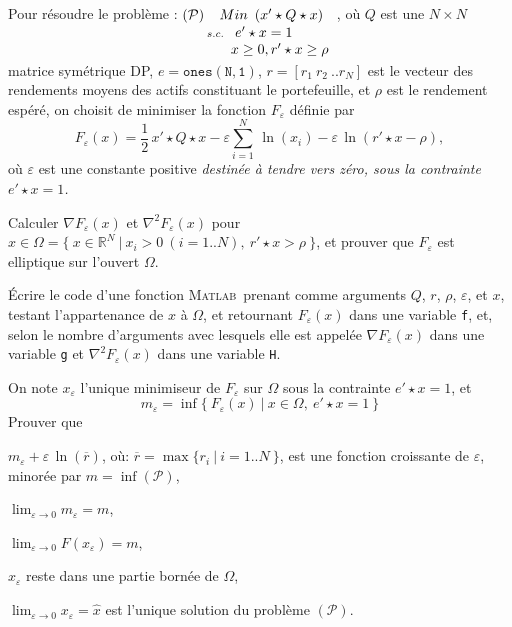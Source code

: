 \documentclass[12pt,a4paper,fleqn]{report}
\newcommand{\matlab}{\textsc{Matlab}}
\newcommand{\R}{\mathbb R}
\newcommand{\grad}{\nabla}
\newcommand{\hess}{\nabla^2}
\newcommand{\on}{\begin{displaymath}}
\newcommand{\off}{\end{displaymath}}
\renewcommand{\P}{\mathcal P}
\newcommand{\push}[1]{\rule{0pt}{0pt}\hspace{#1pt}}
\begin{document}
\begin{exercice}
Pour r\'esoudre le probl\`eme :
\mbox{$ (\P) \push{2} \underset{s. c.\push{3}\begin{array}[t]{l} e'\star x=1\\ \push{-3}x\geq 0, r'\star x\geq \rho\end{array}}%
{Min\push{5} (x'\star Q\star x)}$}, o\`u $Q$ est une $N\times N$ matrice sym\'etrique DP, $e= \mathtt{ones(N,1)}$, 
$r=[r_1\ r_2\ .. r_N]$ est le vecteur des rendements moyens des actifs constituant le portefeuille, et $\rho$ est le rendement esp\'er\'e, on choisit de minimiser la fonction $F_{\varepsilon}$ d\'efinie par
\on F_{\varepsilon}(x)=\frac{1}{2}\,x'\star Q\star x -\varepsilon\sum_{i=1}^N\,\ln (x_i) -\varepsilon\,\ln (r'\star x-\rho), \off
o\`u $\varepsilon$ est une constante positive \it destin\'ee \`a tendre vers z\'ero\rm, sous la contrainte $e'\star x=1$.
\begin{questions}
\item Calculer $\grad F_{\varepsilon}(x)$ et $\hess F_{\varepsilon}(x)$ pour $x \in \Omega= \{\ x \in \R^N\ |\ x_i > 0\ (i=1..N), \ r' \star x > \rho\ \}$, et prouver que $F_{\varepsilon}$ est elliptique sur l'ouvert $\Omega$.
\item \'Ecrire le code d'une fonction \matlab\ prenant comme arguments $Q$, $r$, $\rho$, $\varepsilon$, et $x$, testant l'appartenance de $x$ \`a $\Omega$, et retournant $F_{\varepsilon}(x)$ dans une variable \texttt{f}, et, selon le nombre d'arguments avec lesquels elle est appel\'ee $\grad F_{\varepsilon}(x)$ dans une variable \texttt{g} et $\hess F_{\varepsilon}(x)$ dans une variable \texttt{H}.
\item On note $x_{\varepsilon}$ l'unique minimiseur de $F_{\varepsilon}$ sur $\Omega$ sous la contrainte $e'\star x=1$, et \on m_{\varepsilon}=\inf \{ \ F_{\varepsilon}(x)\ |\ x\in \Omega,\ e'\star x=1\ \} \off
Prouver que
\begin{subquestions}
\item $m_{\varepsilon} + \varepsilon\,\ln (\overline r)$, o\`u: $\overline r=\max \{r_i\ |\ i=1..N\ \}$, est une fonction croissante de $\varepsilon$, minor\'ee par $m=\inf (\P)$,
\item $\lim_{\varepsilon\rightarrow 0} m_{\varepsilon}=m$,
\item $\lim_{\varepsilon\rightarrow 0} F(x_{\varepsilon})=m$,
\item $x_\varepsilon$ reste dans une partie born\'ee de $\Omega$,
\item $\lim_{\varepsilon\rightarrow 0} x_{\varepsilon}=\hat x$ est l'unique solution du probl\`eme $(\P)$.

\end{subquestions}
\end{questions}
\end{exercice}
\end{document}
